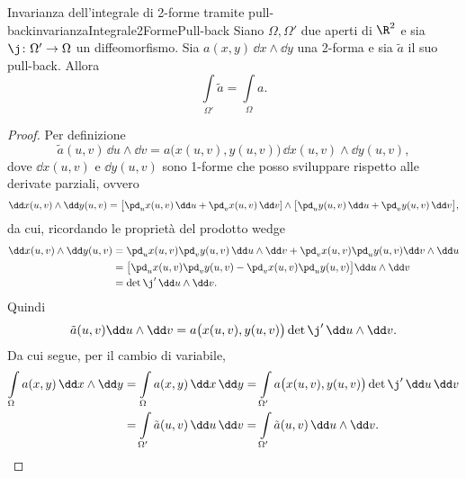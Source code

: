 \begin{teor}{Invarianza dell'integrale di 2-forme tramite pull-back}{invarianzaIntegrale2FormePull-back}
	Siano \(\Omega,\Omega'\) due aperti di \(\R^2\) e sia \(\j\colon \Omega' \to \Omega\) un diffeomorfismo.
	Sia \(a(x,y)\,\dd x \wedge \dd y\) una 2-forma e sia \(\tilde{a}\) il suo pull-back.
	Allora
	\[
		\int\limits_{\Omega'} \tilde{a} = \int\limits_\Omega a.
	\]
\end{teor}

\begin{proof}
	Per definizione
	\[
		\tilde{a}(u,v)\,\dd u \wedge \dd v = a\big(x(u,v),y(u,v)\big)\,\dd x(u,v) \wedge \dd y(u,v),
	\]
	dove \(\dd x(u,v)\) e \(\dd y(u,v)\) sono 1-forme che posso sviluppare rispetto alle derivate parziali, ovvero
	\[
		\dd x(u,v) \wedge \dd y(u,v) = \big[\pd_u x(u,v)\,\dd u + \pd_v x(u,v)\,\dd v] \wedge \big[\pd_u y(u,v)\,\dd u + \pd_v y(u,v)\,\dd v\big],
	\]
	da cui, ricordando le proprietà del prodotto wedge
	\[
		\begin{split}
			\dd x(u,v) \wedge \dd y(u,v) & = \pd_u x(u,v) \pd_v y(u,v)\,\dd u \wedge \dd v + \pd_v x(u,v) \pd_u y(u,v) \dd v \wedge \dd u\\
			& = \big[\pd_u x(u,v) \pd_v y(u,v) - \pd_v x(u,v) \pd_u y(u,v)\big] \dd u \wedge \dd v\\
			& = \det \j' \,\dd u \wedge \dd v.
		\end{split}
	\]
	Quindi
	\[
		\tilde{a}(u,v) \dd u \wedge \dd v = a\big(x(u,v),y(u,v)\big) \det \j' \,\dd u \wedge \dd v.
	\]
	Da cui segue, per il cambio di variabile,
	\[
		\begin{split}
			\int\limits_\Omega a(x,y)\,\dd x \wedge \dd y & = \int\limits_\Omega a(x,y)\,\dd x\,\dd y = \int\limits_{\Omega'} a\big(x(u,v),y(u,v)\big) \det \j'\,\dd u\,\dd v\\
			& = \int\limits_{\Omega'} \tilde{a}(u,v) \,\dd u\,\dd v = \int\limits_{\Omega'} \tilde{a}(u,v)\,\dd u \wedge \dd v.\qedhere
		\end{split}
	\]
\end{proof}

